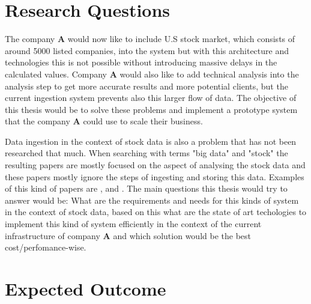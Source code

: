 \documentclass[article,11pt]{article}
\begin{document}
\section{Research Questions}

The company \textbf{A} would now like to include U.S stock market, which consists of around 5000 listed companies, into the system but with this architecture and technologies this is not possible without introducing massive delays in the calculated values.
Company \textbf{A} would also like to add technical analysis into the analysis step to get more accurate results and more potential clients, but the current ingestion system prevents also this larger flow of data.
The objective of this thesis would be to solve these problems and implement a prototype system that the company \textbf{A} could use to scale their business.


Data ingestion in the context of stock data is also a problem that has not been researched that much.
When searching with terms "big data" and "stock" the resulting papers are mostly focused on the aspect of analysing the stock data and these papers mostly ignore the steps of ingesting and storing this data.
Examples of this kind of papers are \cite{wu}, \cite{aghakhani} and \cite{kao}.
The main questions this thesis would try to answer would be: What are the requirements and needs for this kinds of system in the context of stock data, based on this what are the state of art techologies to implement this kind of system efficiently in the context of the current infrastructure of company \textbf{A} and which solution would be the best cost/perfomance-wise.

\section{Expected Outcome}
\end{document}
